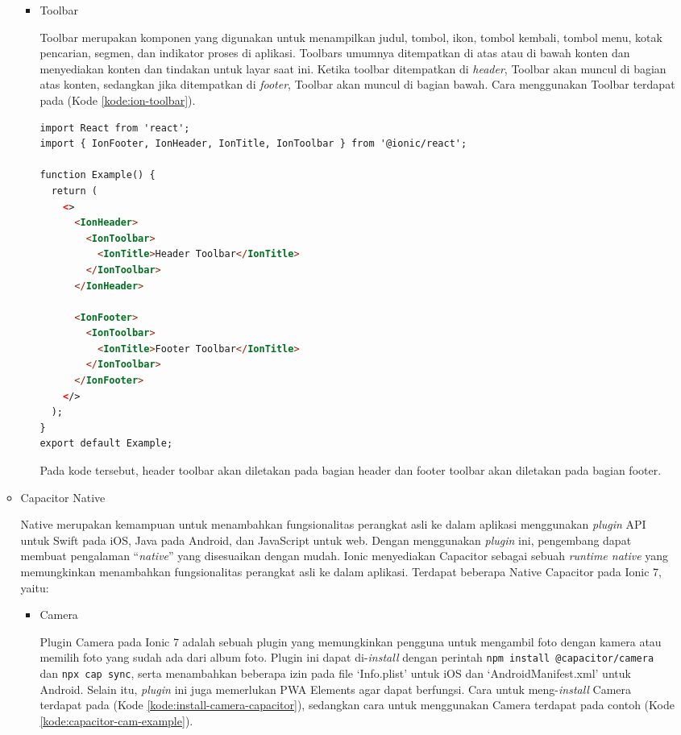 \documentclass[a4paper,twoside]{article}
\begin{document}
\begin{enumerate}
\begin{itemize}
\begin{itemize}
    \item Toolbar

    Toolbar merupakan komponen yang digunakan untuk menampilkan judul, tombol, ikon, tombol kembali, tombol menu, kotak pencarian, segmen, dan indikator proses di aplikasi. Toolbars umumnya ditempatkan di atas atau di bawah konten dan menyediakan konten dan tindakan untuk layar saat ini. Ketika toolbar ditempatkan di \textit{header}, Toolbar akan muncul di bagian atas konten, sedangkan jika ditempatkan di \textit{footer}, Toolbar akan muncul di bagian bawah. Cara menggunakan Toolbar terdapat pada (Kode \ref{kode:ion-toolbar}).

\begin{lstlisting}[language=HTML, caption=Contoh Kode Penggunaan Toolbar, label=kode:ion-toolbar, breaklines=true]
import React from 'react';
import { IonFooter, IonHeader, IonTitle, IonToolbar } from '@ionic/react';

function Example() {
  return (
    <>
      <IonHeader>
        <IonToolbar>
          <IonTitle>Header Toolbar</IonTitle>
        </IonToolbar>
      </IonHeader>

      <IonFooter>
        <IonToolbar>
          <IonTitle>Footer Toolbar</IonTitle>
        </IonToolbar>
      </IonFooter>
    </>
  );
}
export default Example;
\end{lstlisting}

Pada kode tersebut, header toolbar akan diletakan pada bagian header dan footer toolbar akan diletakan pada bagian footer. 
        
    \end{itemize}

    \item Capacitor Native

    Native merupakan kemampuan untuk menambahkan fungsionalitas perangkat asli ke dalam aplikasi menggunakan \textit{plugin} API untuk Swift pada iOS, Java pada Android, dan JavaScript untuk web. Dengan menggunakan \textit{plugin} ini, pengembang dapat membuat pengalaman ``\textit{native}'' yang disesuaikan dengan mudah. Ionic menyediakan Capacitor sebagai sebuah \textit{runtime native} yang memungkinkan menambahkan fungsionalitas perangkat asli ke dalam aplikasi. Terdapat beberapa Native Capacitor pada Ionic 7, yaitu:

    \begin{itemize}
        \item Camera

        Plugin Camera pada Ionic 7 adalah sebuah plugin yang memungkinkan pengguna untuk mengambil foto dengan kamera atau memilih foto yang sudah ada dari album foto. Plugin ini dapat di-\textit{install} dengan perintah \texttt{npm install @capacitor/camera}  dan \texttt{npx cap sync}, serta menambahkan beberapa izin pada file `Info.plist' untuk iOS dan `AndroidManifest.xml' untuk Android. Selain itu, \textit{plugin} ini juga memerlukan PWA Elements agar dapat berfungsi. Cara untuk meng-\textit{install} Camera terdapat pada (Kode \ref{kode:install-camera-capacitor}), sedangkan cara untuk menggunakan Camera terdapat pada contoh (Kode \ref{kode:capacitor-cam-example}).


\end{itemize}
\end{itemize}
\end{enumerate}
\end{document}
